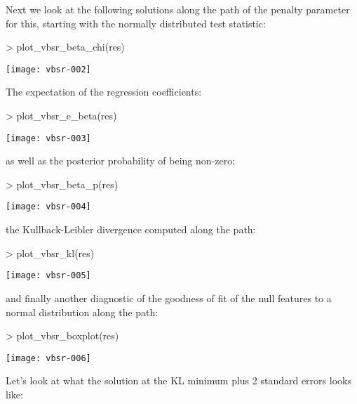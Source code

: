 \documentclass[a4paper]{article}
\begin{document}
Next we look at the following solutions along the path of the penalty parameter for this, starting with the normally distributed test statistic:
\begin{center}
\begin{Schunk}
\begin{Sinput}
> plot_vbsr_beta_chi(res)
\end{Sinput}
\end{Schunk}
\texttt{[image: vbsr-002]}
\end{center}
The expectation of the regression coefficients:
\begin{center}
\begin{Schunk}
\begin{Sinput}
> plot_vbsr_e_beta(res)
\end{Sinput}
\end{Schunk}
\texttt{[image: vbsr-003]}
\end{center}
as well as the posterior probability of being non-zero:
\begin{center}
\begin{Schunk}
\begin{Sinput}
> plot_vbsr_beta_p(res)
\end{Sinput}
\end{Schunk}
\texttt{[image: vbsr-004]}
\end{center}
the Kullback-Leibler divergence computed along the path:
\begin{center}
\begin{Schunk}
\begin{Sinput}
> plot_vbsr_kl(res)
\end{Sinput}
\end{Schunk}
\texttt{[image: vbsr-005]}
\end{center}
and finally another diagnostic of the goodness of fit of the null features to a normal distribution along the path:
\begin{center}
\begin{Schunk}
\begin{Sinput}
> plot_vbsr_boxplot(res)
\end{Sinput}
\end{Schunk}
\texttt{[image: vbsr-006]}
\end{center}
Let's look at what the solution at the KL minimum plus 2 standard errors looks like:
\end{document}

